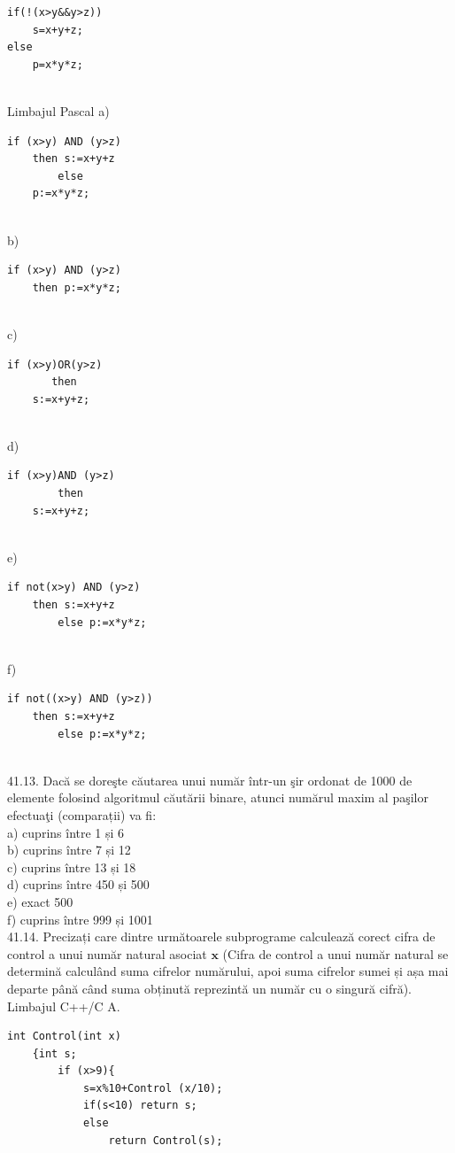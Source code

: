 \begin{itemize}
\begin{enumerate}
\begin{verbatim}
if(!(x>y&&y>z))
    s=x+y+z;
else
    p=x*y*z;
\end{verbatim}
\\
Limbajul Pascal
a) \begin{verbatim}
if (x>y) AND (y>z)
    then s:=x+y+z
        else
    p:=x*y*z;
\end{verbatim}
\\
b) \begin{verbatim}
if (x>y) AND (y>z)
    then p:=x*y*z;
\end{verbatim}
\\
c) \begin{verbatim}
if (x>y)OR(y>z)
       then
    s:=x+y+z;
\end{verbatim}
\\
d) \begin{verbatim}
if (x>y)AND (y>z)
        then
    s:=x+y+z;
\end{verbatim}
\\
e) \begin{verbatim}
if not(x>y) AND (y>z)
    then s:=x+y+z
        else p:=x*y*z;
\end{verbatim}
\\
f) \begin{verbatim}
if not((x>y) AND (y>z))
    then s:=x+y+z
        else p:=x*y*z;
\end{verbatim}
\\
41.13. Dacă se doreşte căutarea unui număr într-un şir ordonat de 1000 de elemente folosind algoritmul căutării binare, atunci numărul maxim al paşilor efectuaţi (comparații) va fi:
\\
a) cuprins între 1 și 6
\\
b) cuprins între 7 și 12
\\
c) cuprins între 13 și 18
\\
d) cuprins între 450 și 500
\\
e) exact 500
\\
f) cuprins între 999 și 1001
\\
41.14. Precizați care dintre următoarele subprograme calculează corect cifra de control a unui număr natural asociat $\mathbf{x}$ (Cifra de control a unui număr natural se determină calculând suma cifrelor numărului, apoi suma cifrelor sumei și așa mai departe până când suma obținută reprezintă un număr cu o singură cifră).
Limbajul C++/C
A. \begin{verbatim}
int Control(int x)
    {int s;
        if (x>9){
            s=x%10+Control (x/10);
            if(s<10) return s;
            else
                return Control(s);

\end{verbatim}
\end{enumerate}
\end{itemize}
